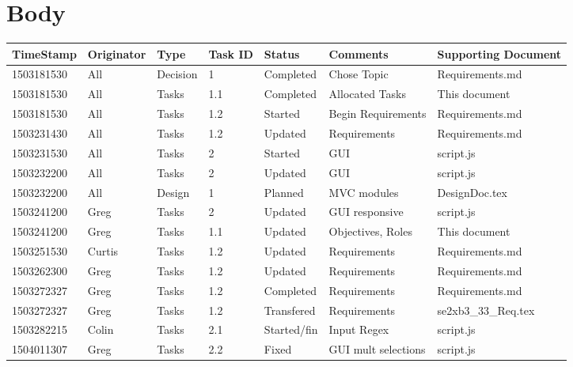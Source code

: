 \documentclass[10pt, oneside]{article}
\begin{document}

\section{Body}

\setlength{\tabcolsep}{5pt}
\begin{tabular}{|p{1.8cm}|p{1.75cm}|p{1.25cm}|p{0.8cm}|p{1.6cm}|p{3cm}|p{2.8cm}|}

	\hline
	TimeStamp & Originator & Type & Task ID & Status & Comments & Supporting Document \\
	\hline
	1503181530 & All & Decision & 1 & Completed & Chose Topic & Requirements.md \\
	\hline
	1503181530 & All & Tasks & 1.1 & Completed & Allocated Tasks & This document \\
	\hline
	1503181530 & All & Tasks & 1.2 & Started & Begin Requirements & Requirements.md \\
	\hline
	1503231430 & All & Tasks & 1.2 & Updated & Requirements & Requirements.md \\
	\hline
	1503231530 & All & Tasks & 2 & Started & GUI & script.js \\
	\hline
	1503232200 & All & Tasks & 2 & Updated & GUI & script.js \\
	\hline 
	1503232200 & All & Design & 1 & Planned & MVC modules & DesignDoc.tex \\
	\hline
	1503241200 & Greg & Tasks & 2 & Updated & GUI responsive & script.js \\
	\hline
	1503241200 & Greg & Tasks & 1.1 & Updated & Objectives, Roles & This document \\
	\hline
	1503251530 & Curtis & Tasks & 1.2 & Updated & Requirements & Requirements.md \\
	\hline
	1503262300 & Greg & Tasks & 1.2 & Updated & Requirements & Requirements.md \\
	\hline
	1503272327 & Greg & Tasks & 1.2 & Completed & Requirements & Requirements.md \\
	\hline
	1503272327 & Greg & Tasks & 1.2 & Transfered & Requirements & se2xb3\_33\_Req.tex \\
	\hline
	1503282215 & Colin & Tasks & 2.1 & Started/fin & Input Regex & script.js \\
	\hline
	1504011307 & Greg & Tasks & 2.2 & Fixed & GUI mult selections & script.js \\

\end{tabular}
\end{document}
